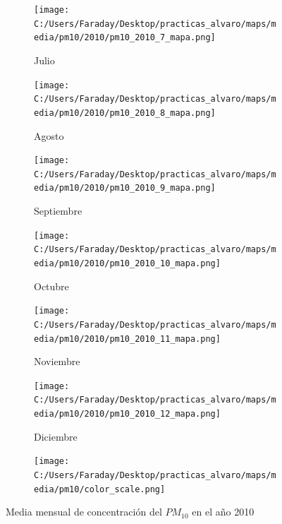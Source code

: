 \documentclass[12pt]{article}
\begin{document}
\begin{figure}[H]
\begin{subfigure}[H]{0.15\textwidth}
\texttt{[image: C:/Users/Faraday/Desktop/practicas\_alvaro/maps/media/pm10/2010/pm10\_2010\_7\_mapa.png]}
\captionsetup{labelformat=empty}
\caption{Julio}
\label{fig:map-pm10-2010-7}
\end{subfigure}
%
\begin{subfigure}[H]{0.15\textwidth}
\texttt{[image: C:/Users/Faraday/Desktop/practicas\_alvaro/maps/media/pm10/2010/pm10\_2010\_8\_mapa.png]}
\captionsetup{labelformat=empty}
\caption{Agosto}
\label{fig:map-pm10-2010-8}
\end{subfigure}
%
\begin{subfigure}[H]{0.15\textwidth}
\texttt{[image: C:/Users/Faraday/Desktop/practicas\_alvaro/maps/media/pm10/2010/pm10\_2010\_9\_mapa.png]}
\captionsetup{labelformat=empty}
\caption{Septiembre}
\label{fig:map-pm10-2010-9}
\end{subfigure}
%
\begin{subfigure}[H]{0.15\textwidth}
\texttt{[image: C:/Users/Faraday/Desktop/practicas\_alvaro/maps/media/pm10/2010/pm10\_2010\_10\_mapa.png]}
\captionsetup{labelformat=empty}
\caption{Octubre}
\label{fig:map-pm10-2010-10}
\end{subfigure}
%
\begin{subfigure}[H]{0.15\textwidth}
\texttt{[image: C:/Users/Faraday/Desktop/practicas\_alvaro/maps/media/pm10/2010/pm10\_2010\_11\_mapa.png]}
\captionsetup{labelformat=empty}
\caption{Noviembre}
\label{fig:map-pm10-2010-11}
\end{subfigure}
%
\begin{subfigure}[H]{0.15\textwidth}
\texttt{[image: C:/Users/Faraday/Desktop/practicas\_alvaro/maps/media/pm10/2010/pm10\_2010\_12\_mapa.png]}
\captionsetup{labelformat=empty}
\caption{Diciembre}
\label{fig:map-pm10-2010-12}
\end{subfigure}

\begin{subfigure}[H]{0.45\textwidth}
\texttt{[image: C:/Users/Faraday/Desktop/practicas\_alvaro/maps/media/pm10/color\_scale.png]}
\captionsetup{labelformat=empty}
\caption{}
\end{subfigure}

\vspace*{-7mm}
\caption{Media mensual de concentración del $PM_{10}$ en el año 2010}
\label{fig:map-pm10-2010}
\end{figure}
\end{document}
